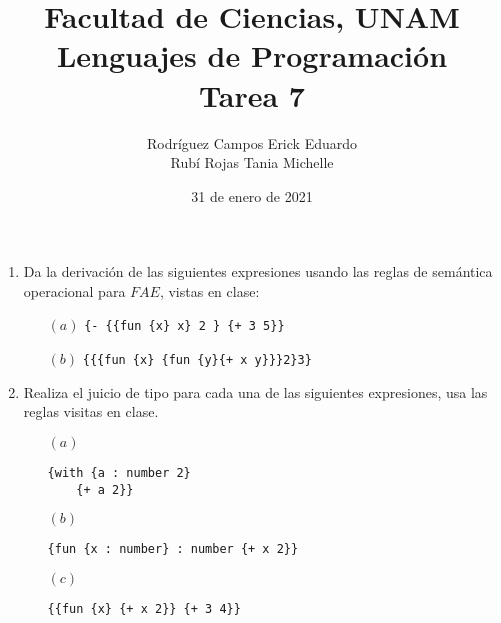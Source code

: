 \documentclass[letterpaper,11pt]{article}
\title{Facultad de Ciencias, UNAM \\ 
       Lenguajes de Programación\\ 
       Tarea 7}
\author{ Rodríguez Campos Erick Eduardo\\ Rubí Rojas Tania Michelle}
\date{31 de enero de 2021}
\begin{document}
\maketitle
\begin{enumerate}
    \item Da la derivación de las siguientes expresiones usando las reglas de 
    semántica operacional para $FAE$, vistas en clase:
    \begin{itemize}
        \item [$(a)$] \texttt{\{- \{\{fun \{x\} x\} 2 \} \{+ 3 5\}\}}
        \item [$(b)$] \texttt{\{\{\{fun \{x\} \{fun \{y\}\{+ x y\}\}\}2\}3\}}
    \end{itemize}
    \item Realiza el juicio de tipo para cada una de las siguientes expresiones, 
    usa las reglas visitas en clase.
    \begin{itemize}
        \item [$(a)$] \begin{verbatim}{with {a : number 2}
    {+ a 2}} 
        \end{verbatim}
        \begin{prooftree}
        \end{prooftree}
        \item [$(b)$] \begin{verbatim}{fun {x : number} : number {+ x 2}}
        \end{verbatim}
        \begin{prooftree}
        \end{prooftree}
        \item [$(c)$] \begin{verbatim}{{fun {x} {+ x 2}} {+ 3 4}}
        \end{verbatim}
        \begin{prooftree}

\end{prooftree}
\end{itemize}
\end{enumerate}
\end{document}
